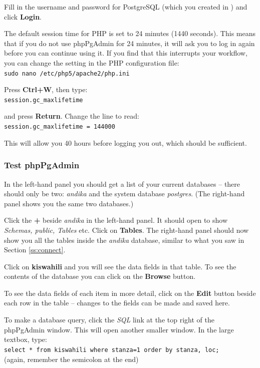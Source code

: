 Fill in the username and password for PostgreSQL (which you created in ) and click \textbf{Login}.

The default session time for PHP is set to 24 minutes (1440 seconds).  This means that if you do not use phpPgAdmin for 24 minutes, it will ask you to log in again before you can continue using it.  If you find that this interrupts your workflow, you can change the setting in the PHP configuration file:\\
\verb|sudo nano /etc/php5/apache2/php.ini|

Press \textbf{Ctrl+W}, then type:\\
\verb|session.gc_maxlifetime|

and press \textbf{Return}. Change the line to read: \\
\verb|session.gc_maxlifetime = 144000|

This will allow you 40 hours before logging you out, which should be sufficient.

\subsubsection{Test phpPgAdmin}
\label{ss:testppa}

In the left-hand panel you should get a list of your current databases -- there should only be two: \textit{andika} and the system database \textit{postgres}. (The right-hand panel shows you the same two databases.)

Click the \textbf{+} beside \textit{andika} in the left-hand panel.  It should open to show \textit{Schemas, public, Tables} etc. Click on \textbf{Tables}. The right-hand panel should now show you all the tables inside the \textit{andika} database, similar to what you saw in Section \ref{ss:connect}.

Click on \textbf{kiswahili} and you will see the data fields in that table. To see the contents of the database you can click on the \textbf{Browse} button.

To see the data fields of each item in more detail, click on the \textbf{Edit} button beside each row in the table -- changes to the fields can be made and saved here.

To make a database query, click the \textit{SQL} link at the top right of the phpPgAdmin window.  This will open another smaller window.  In the large textbox, type:\\
\verb|select * from kiswahili where stanza=1 order by stanza, loc;|\\
(again, remember the semicolon at the end)

